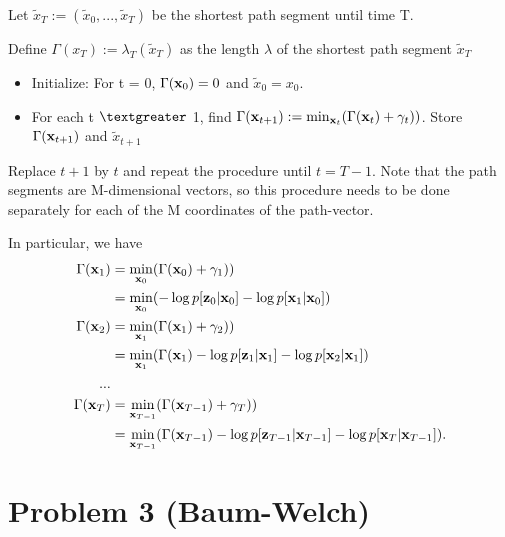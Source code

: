 \documentclass{article}
\begin{document}
Let $ \tilde{x}_T:= (\tilde{x}_0,...,\tilde{x}_T)$ be the shortest path segment until time T.

Define $\Gamma(x_T) := \lambda_T(\tilde{x}_T)$ as the length $\lambda$ of the shortest path segment $\tilde{x}_T$\newline


\begin{itemize}
\item Initialize:
For t = 0, $\Gamma({\bf{x}}_0) = 0$ and $\tilde{x}_0 = x_0$.\newline

\item For each t $\textgreater $ 1, find $\Gamma({\bf{x}}_{t+1}):= \min_{{\bf{x}}_{t}} (\Gamma({\bf{x}}_t) + \gamma_{t})) $. \newline
Store $\Gamma({\bf{x}}_{t+1})$ and $\tilde{x}_{t+1}$
\end{itemize}

Replace $t+1$ by $t$ and repeat the procedure until $t = T-1$.
Note that the path segments are M-dimensional vectors, so this procedure needs to be done separately for each of the M coordinates of the path-vector. \newline

In particular, we have
\begin{align}
 \Gamma({\bf{x}}_{1}) &= \min_{{\bf{x}}_{0}} (\Gamma({\bf{x}}_0) + \gamma_{1})) \nonumber \\
 & = \min_{{\bf{x}}_{0}} (-\log p[{\bf{z}}_0|{\bf{x}}_0]- \log  p[{\bf{x}}_{1}|{\bf{x}}_{0}]) \nonumber \\
 \Gamma({\bf{x}}_{2}) &= \min_{{\bf{x}}_{1}} (\Gamma({\bf{x}}_1) + \gamma_{2})) \nonumber \\
 & = \min_{{\bf{x}}_{1}} (\Gamma({\bf{x}}_1) -\log p[{\bf{z}}_1|{\bf{x}}_1]- \log  p[{\bf{x}}_{2}|{\bf{x}}_{1}]) \nonumber \\
  ... & \nonumber\\
 \Gamma({\bf{x}}_{T}) &= \min_{{\bf{x}}_{T-1}} (\Gamma({\bf{x}}_{T-1}) + \gamma_{T})) \nonumber \\
 & = \min_{{\bf{x}}_{T-1}} (\Gamma({\bf{x}}_{T-1}) -\log p[{\bf{z}}_{T-1}|{\bf{x}}_{T-1}]- \log  p[{\bf{x}}_{T}|{\bf{x}}_{T-1}]). 
\end{align}





\section{Problem 3 (Baum-Welch)}
\end{document}
